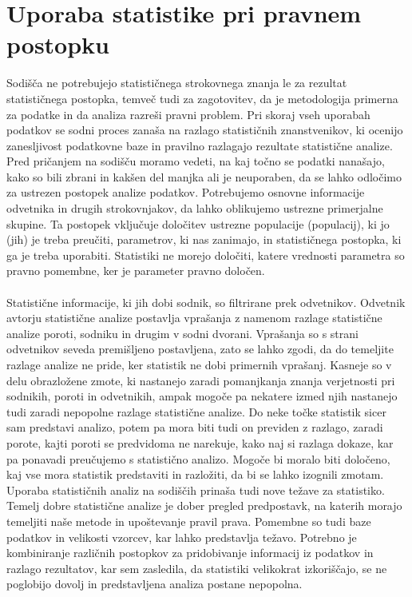 \documentclass[fin1, tisk]{fmfdelo}
\theoremstyle{definition}
\theoremstyle{trditev}
\theoremstyle{izrek}
\begin{document}
\section{Uporaba statistike pri pravnem postopku}
Sodišča ne potrebujejo statističnega strokovnega znanja le za rezultat statističnega postopka, temveč tudi za zagotovitev, da je metodologija
primerna za podatke in da analiza razreši pravni problem. Pri skoraj vseh uporabah podatkov se sodni proces zanaša na razlago
statističnih znanstvenikov, ki ocenijo zanesljivost podatkovne baze in pravilno razlagajo rezultate statistične analize. Pred pričanjem na sodišču moramo
vedeti, na kaj točno se podatki nanašajo, kako so bili zbrani in kakšen del manjka ali je neuporaben, da se lahko odločimo za ustrezen postopek
analize podatkov. Potrebujemo osnovne informacije odvetnika in drugih strokovnjakov, da lahko oblikujemo ustrezne primerjalne skupine. Ta postopek
vključuje določitev ustrezne populacije (populacij), ki jo (jih) je treba preučiti, parametrov, ki nas zanimajo, in statističnega postopka, ki ga
je treba uporabiti. Statistiki ne morejo določiti, katere vrednosti parametra so pravno pomembne, ker je parameter pravno določen.\\\\
Statistične informacije, ki jih dobi sodnik, so filtrirane prek odvetnikov. Odvetnik avtorju statistične analize postavlja vprašanja z namenom razlage
statistične analize poroti, sodniku in drugim v sodni dvorani. Vprašanja so s strani odvetnikov seveda premišljeno postavljena, zato se lahko zgodi,
da do temeljite razlage analize ne pride, ker statistik ne dobi primernih vprašanj. Kasneje so v delu obrazložene zmote, ki nastanejo
zaradi pomanjkanja znanja verjetnosti pri sodnikih, poroti in odvetnikih, ampak mogoče pa nekatere izmed njih nastanejo tudi zaradi nepopolne razlage
statistične analize. Do neke točke statistik sicer sam predstavi analizo, potem pa mora biti tudi on previden z razlago, zaradi porote,
kajti poroti se predvidoma ne narekuje, kako naj si razlaga dokaze, kar pa ponavadi preučujemo s statistično analizo. Mogoče bi moralo biti določeno,
kaj vse mora statistik predstaviti in razložiti, da bi se lahko izognili zmotam.\\
Uporaba statističnih analiz na sodiščih prinaša tudi nove težave za statistiko. Temelj dobre statistične analize je dober pregled predpostavk, na
katerih morajo temeljiti naše metode in upoštevanje pravil prava. Pomembne so tudi baze podatkov in velikosti vzorcev, kar lahko predstavlja težavo.
Potrebno je kombiniranje različnih postopkov za pridobivanje informacij iz podatkov in razlago rezultatov, kar sem zasledila, da statistiki
velikokrat izkoriščajo, se ne poglobijo dovolj in predstavljena analiza postane nepopolna.
\end{document}
